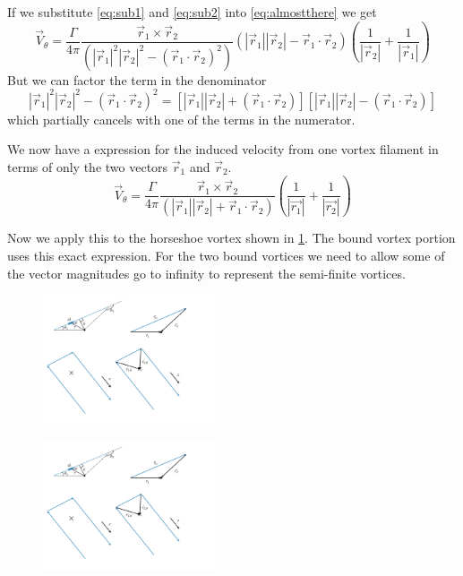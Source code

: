 \documentclass{article}
\begin{document}
If we substitute \cref{eq:sub1} and \cref{eq:sub2} into \cref{eq:almostthere} we get 
\begin{equation}
\vec{V}_\theta = \frac{\Gamma}{4 \pi} \frac{\vec{r}_1 \times \vec{r}_2}{(|\vec{r}_1|^2|\vec{r}_2|^2 - (\vec{r}_1 \cdot \vec{r}_2)^2)} (|\vec{r}_1||\vec{r}_2| - \vec{r}_1 \cdot \vec{r}_2 )\left(\frac{1}{|\vec{r}_2|} + \frac{1}{|\vec{r}_1|} \right)
\end{equation}
But we can factor the term in the denominator
\begin{equation}
|\vec{r}_1|^2|\vec{r}_2|^2 - (\vec{r}_1 \cdot \vec{r}_2)^2 = \left[|\vec{r}_1||\vec{r}_2| + (\vec{r}_1 \cdot \vec{r}_2)\right] \left[|\vec{r}_1||\vec{r}_2| - (\vec{r}_1 \cdot \vec{r}_2) \right]
\end{equation}
which partially cancels with one of the terms in the numerator.

We now have a expression for the induced velocity from one vortex filament in terms of only the two vectors $\vec{r}_1$ and $\vec{r}_2$. 
\begin{equation}
\vec{V}_\theta = \frac{\Gamma}{4 \pi} \frac{\vec{r}_1 \times \vec{r}_2}{(|\vec{r}_1||\vec{r}_2| + \vec{r}_1 \cdot \vec{r}_2)} \left(\frac{1}{|\vec{r_1}|} + \frac{1}{|\vec{r_2}|} \right)
\label{eq:segment}
\end{equation}

Now we apply this to the horseshoe vortex shown in \cref{fig:horseshoevortex}.  The bound vortex portion uses this exact expression.  For the two bound vortices we need to allow some of the vector magnitudes go to infinity to represent the semi-finite vortices.  
\begin{figure}[htbp]
\centering
\includegraphics[width=2in]{figs/horseshoevortex}
\caption{}
\label{fig:horseshoevortex}
\end{figure}

\begin{figure}[htbp]
\centering
\includegraphics[width=2in]{figs/boundvortex}
\caption{}
\label{fig:boundvortex}
\end{figure}
\end{document}
